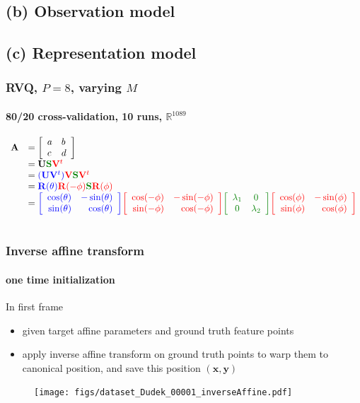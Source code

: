 \subsection{(b) Observation model}


\subsection{(c) Representation model}
\begin{frame}[plain]
\frametitle{RVQ, $P=8$, varying $M$}
\framesubtitle{80/20 cross-validation, 10 runs, $\mathbb{R}^{1089}$}
\logoCSIPCPL\mypagenum
\scriptsize
\begin{changemargin}{-1.3in}{0in}
\begin{equation}
\begin{array}{llllllll}
\mathbf{A} &= \left[\begin{array}{lll}a & b \\ c & d\\ \end{array}\right] \\
&=\mathbf{U}{\color{darkgreen}\mathbf{S}}{\color{red}\mathbf{V}^t} \\
&={\color{blue}(\mathbf{U}\mathbf{V}^t)}{\color{red}\mathbf{V}}{\color{darkgreen}\mathbf{S}}{\color{red}\mathbf{V}^t}\\
&={\color{blue}\mathbf{R}(\theta)}{\color{red}\mathbf{R}(-\phi)}{\color{darkgreen}\mathbf{S}}{\color{red}\mathbf{R} (\phi)}\\
&={\color{blue}\RotMatrixTheta}{\color{red}\RotMatrixminusPhi}{\color{darkgreen}\EigenvalueMatrix}{\color{red}\RotMatrixPhi}\\\\
\end{array}
\label{Eq:AffineDecomposition}
\end{equation}
\end{changemargin}
\end{frame}



\begin{frame}
\frametitle{Inverse affine transform}
\framesubtitle{one time initialization}
\logoCSIPCPL\mypagenum
In first frame
\begin{itemize}
\item given target affine parameters and ground truth feature points
\item apply inverse affine transform on ground truth points to warp them to canonical position, and save this position $(\mathbf{x, y})$
\end{itemize}
\begin{figure}[t]
\centering
\texttt{[image: figs/dataset\_Dudek\_00001\_inverseAffine.pdf]}
\label{fig:original_feature_points}
\end{figure}
\end{frame}




